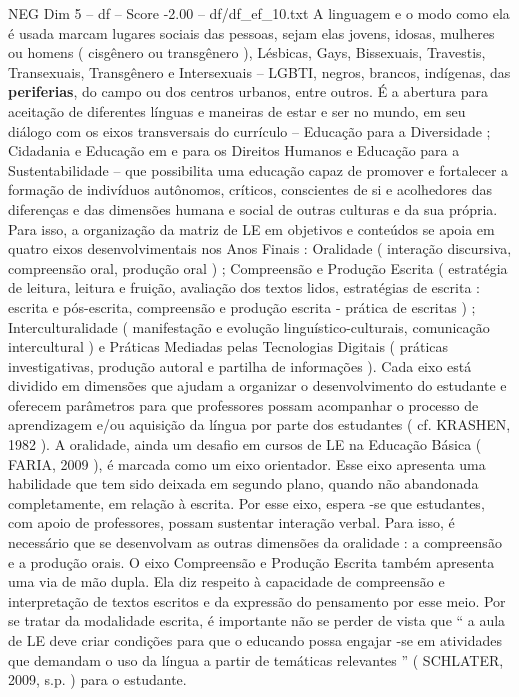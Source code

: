 \begin{textsample}{NEG Dim 5 – df – Score -2.00 – df/df\_ef\_10.txt}
A linguagem e o modo como ela é usada marcam lugares sociais das pessoas, sejam elas jovens, idosas, mulheres ou homens ( cisgênero ou transgênero ), Lésbicas, Gays, Bissexuais, Travestis, Transexuais, Transgênero e Intersexuais – LGBTI, negros, brancos, indígenas, das \textbf{periferias}, do campo ou dos centros urbanos, entre outros.
É a abertura para aceitação de diferentes línguas e maneiras de estar e ser no mundo, em seu diálogo com os eixos transversais do currículo – Educação para a Diversidade ; Cidadania e Educação em e para os Direitos Humanos e Educação para a Sustentabilidade – que possibilita uma educação capaz de promover e fortalecer a formação de indivíduos autônomos, críticos, conscientes de si e acolhedores das diferenças e das dimensões humana e social de outras culturas e da sua própria.
Para isso, a organização da matriz de LE em objetivos e conteúdos se apoia em quatro eixos desenvolvimentais nos Anos Finais : Oralidade ( interação discursiva, compreensão oral, produção oral ) ; Compreensão e Produção Escrita ( estratégia de leitura, leitura e fruição, avaliação dos textos lidos, estratégias de escrita : escrita e pós-escrita, compreensão e produção escrita - prática de escritas ) ; Interculturalidade ( manifestação e evolução linguístico-culturais, comunicação intercultural ) e Práticas Mediadas pelas Tecnologias Digitais ( práticas investigativas, produção autoral e partilha de informações ).
Cada eixo está dividido em dimensões que ajudam a organizar o desenvolvimento do estudante e oferecem parâmetros para que professores possam acompanhar o processo de aprendizagem e/ou aquisição da língua por parte dos estudantes ( cf.
KRASHEN, 1982 ).
A oralidade, ainda um desafio em cursos de LE na Educação Básica ( FARIA, 2009 ), é marcada como um eixo orientador.
Esse eixo apresenta uma habilidade que tem sido deixada em segundo plano, quando não abandonada completamente, em relação à escrita.
Por esse eixo, espera -se que estudantes, com apoio de professores, possam sustentar interação verbal.
Para isso, é necessário que se desenvolvam as outras dimensões da oralidade : a compreensão e a produção orais.
O eixo Compreensão e Produção Escrita também apresenta uma via de mão dupla.
Ela diz respeito à capacidade de compreensão e interpretação de textos escritos e da expressão do pensamento por esse meio.
Por se tratar da modalidade escrita, é importante não se perder de vista que “ a aula de LE deve criar condições para que o educando possa engajar -se em atividades que demandam o uso da língua a partir de temáticas relevantes ” ( SCHLATER, 2009, s.p. ) para o estudante.

\end{textsample}
